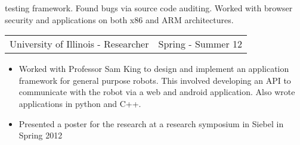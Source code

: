 \documentclass[margin]{res}
\begin{document}
\begin{resume}
\begin{itemize}
                      testing framework.  Found bugs via source code
                      auditing.  Worked with browser security
                      and applications on both x86 and ARM architectures.
		   \end{itemize}
		 \begin{tabular}{p{3in} r}
                  University of Illinois - Researcher &  Spring - Summer 12
                 \end{tabular}
		  \begin{itemize} \itemsep -2pt
                   \item Worked with Professor Sam King to design
                     and implement an application framework for
                     general purpose robots.  This involved developing
                     an API to communicate with the robot via a web
                     and android application.  Also wrote applications
                     in python and C++.
                   \item Presented a poster for
                     the research at a research symposium in Siebel in
                     Spring 2012
                  \end{itemize}


\end{resume}
\end{document}
